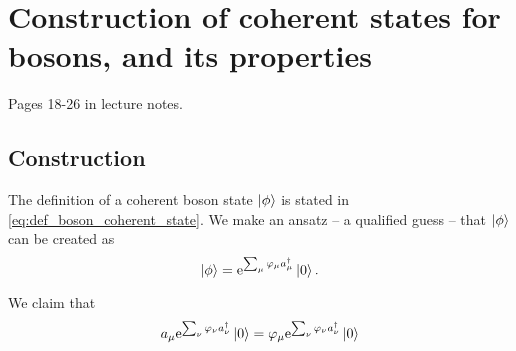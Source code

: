 \section{Construction of coherent states for bosons, and its properties}

Pages 18-26 in lecture notes.

\subsection{Construction}
The definition of a coherent boson state $\ket{\phi}$ is stated in \eqref{eq:def_boson_coherent_state}. We make an ansatz -- a qualified guess -- that $\ket{\phi}$ can be created as
\begin{equation}
\label{eq:construction_coherent_boson}
\ket{\phi} = \mathrm{e}^{\sum_\mu\varphi_\mu a_\mu^\dagger}\ket{0}.
\end{equation}

We claim that 
\begin{equation}
\label{unc:indices}
a_\mu\mathrm{e}^{\sum_\nu\varphi_\nu a_\nu^\dagger}\ket{0} = \varphi_\mu\mathrm{e}^{\sum_\nu\varphi_\nu a_\nu^\dagger}\ket{0}
\end{equation} %

